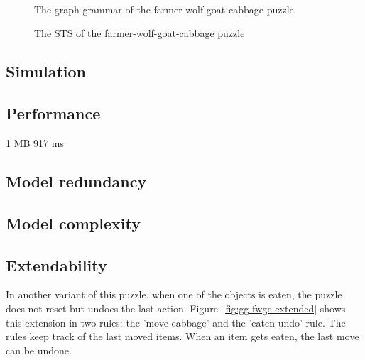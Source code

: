 \begin{figure}[ht]
  \begin{center}
    \hspace{20px}
    \\
    \hspace{20px}
    \\
    \\
  \end{center}
  \caption{The graph grammar of the farmer-wolf-goat-cabbage puzzle}
  \label{fig:gg-fwgc}
\end{figure}

\begin{figure}[ht]
  \begin{center}
    
  \end{center}
  \caption{The STS of the farmer-wolf-goat-cabbage puzzle}
  \label{fig:sts-fwgc}
\end{figure}

\subsection{Simulation}


\subsection{Performance}
1 MB 917 ms

\subsection{Model redundancy}


\subsection{Model complexity}


\subsection{Extendability}
In another variant of this puzzle, when one of the objects is eaten, the puzzle does not reset but undoes the last action. Figure~\ref{fig:gg-fwgc-extended} shows this extension in two rules: the 'move cabbage' and the 'eaten undo' rule. The rules keep track of the last moved items. When an item gets eaten, the last move can be undone.

